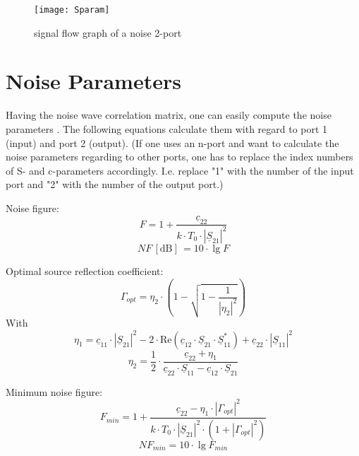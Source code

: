 \documentclass[10pt]{report}
\begin{document}
\begin{figure}[ht]
\begin{center}
\texttt{[image: Sparam]}
\end{center}
\caption{signal flow graph of a noise 2-port}
\label{fig:Sparam}
\end{figure}
\FloatBarrier


\section{Noise Parameters}

Having the noise wave correlation matrix, one can easily compute the
noise parameters \cite{Wedge}.  The following equations calculate them with regard
to port 1 (input) and port 2 (output). (If one uses an n-port and want to calculate
the noise parameters regarding to other ports, one has to replace the index numbers
of S- and c-parameters accordingly. I.e. replace "1" with the number of the input
port and "2" with the number of the output port.)

\addvspace{12pt}

Noise figure:
\begin{equation}
F = 1 + \frac{\underline{c}_{22}}{k\cdot T_0\cdot |\underline{S}_{21}|^2}
\label{eqn:nparamF}
\end{equation}
\begin{equation}
NF\,[\text{dB}]\, = 10\cdot\lg F
\end{equation}

\addvspace{12pt}

Optimal source reflection coefficient:
\begin{equation}
\Gamma_{opt} = \eta_2\cdot\left( 1-\sqrt{1-\frac{1}{|\eta_2|^2}} \right)
\end{equation}
With
\begin{equation}
\eta_1 = \underline{c}_{11}\cdot |\underline{S}_{21}|^2
       - 2\cdot \text{Re}\left(\underline{c}_{12}\cdot\underline{S}_{21}\cdot\underline{S}_{11}^*\right)
       + \underline{c}_{22}\cdot|\underline{S}_{11}|^2
\end{equation}
\begin{equation}
\eta_2 = \frac{1}{2}\cdot\frac{\underline{c}_{22} + \eta_1}
              {\underline{c}_{22}\cdot\underline{S}_{11} - \underline{c}_{12}\cdot\underline{S}_{21}}
\end{equation}

\addvspace{12pt}

Minimum noise figure:
\begin{equation}
F_{min} = 1 + \frac{\underline{c}_{22} - \eta_1\cdot |\Gamma_{opt}|^2}
                   {k\cdot T_0\cdot |\underline{S}_{21}|^2\cdot (1+|\Gamma_{opt}|^2)}
\end{equation}
\begin{equation}
NF_{min} = 10\cdot \lg F_{min}
\end{equation}
\end{document}

